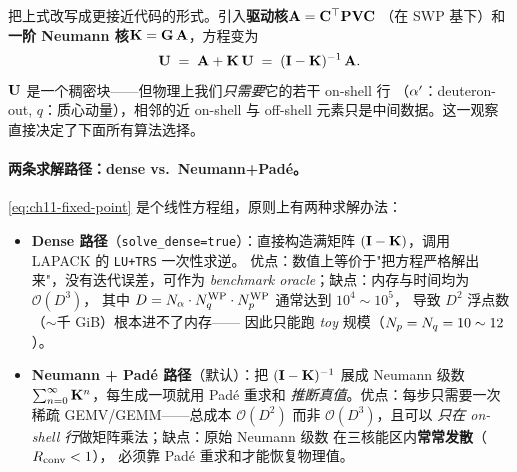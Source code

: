 把上式改写成更接近代码的形式。引入\textbf{驱动核}\(\mathbf{A} = \mathbf{C}^\top \mathbf{P} \mathbf{V} \mathbf{C}\)
（在 SWP 基下）和\textbf{一阶 Neumann 核}\(\mathbf{K} = \mathbf{G}\,\mathbf{A}\)，方程变为
\begin{equation}
\label{eq:ch11-fixed-point}
\mathbf{U} \;=\; \mathbf{A} + \mathbf{K}\,\mathbf{U}
\;=\; (\mathbf{I} - \mathbf{K})^{-1}\,\mathbf{A}.
\end{equation}
\(\mathbf{U}\) 是一个稠密块——但物理上我们\emph{只需要}它的若干 on-shell 行
（\(\alpha'\)：deuteron-out, \(q\)：质心动量），相邻的近 on-shell 与 off-shell
元素只是中间数据。这一观察直接决定了下面所有算法选择。

\paragraph{两条求解路径：dense vs.\ Neumann+Padé。}
\cref{eq:ch11-fixed-point} 是个线性方程组，原则上有两种求解办法：
\begin{itemize}
  \item \textbf{Dense 路径}（\texttt{solve\_dense=true}）：直接构造满矩阵
        \((\mathbf{I} - \mathbf{K})\)，调用 LAPACK 的 \texttt{LU+TRS} 一次性求逆。
        优点：数值上等价于"把方程严格解出来"，没有迭代误差，可作为
        \emph{benchmark oracle}；缺点：内存与时间均为 \(\mathcal{O}(D^3)\)，
        其中 \(D = N_\alpha \cdot {N_{q}^{\text{WP}}} \cdot {N_{p}^{\text{WP}}}\) 通常达到 \(10^4\sim 10^5\)，
        导致 \(D^2\) 浮点数（\(\sim\)千 GiB）根本进不了内存——
        因此只能跑 \emph{toy} 规模（\(N_p=N_q=10\sim 12\)）。
  \item \textbf{Neumann + Padé 路径}（默认）：把
        \((\mathbf{I} - \mathbf{K})^{-1}\) 展成 Neumann 级数
        \(\sum_{n=0}^{\infty}\mathbf{K}^n\)，每生成一项就用 Padé 重求和
        \emph{推断真值}。优点：每步只需要一次稀疏 GEMV/GEMM——总成本
        \(\mathcal{O}(D^2)\) 而非 \(\mathcal{O}(D^3)\)，且可以
        \emph{只在 on-shell 行}做矩阵乘法；缺点：原始 Neumann 级数
        在三核能区内\textbf{常常发散}（\(R_{\text{conv}} < 1\)），
        必须靠 Padé 重求和才能恢复物理值。
\end{itemize}

